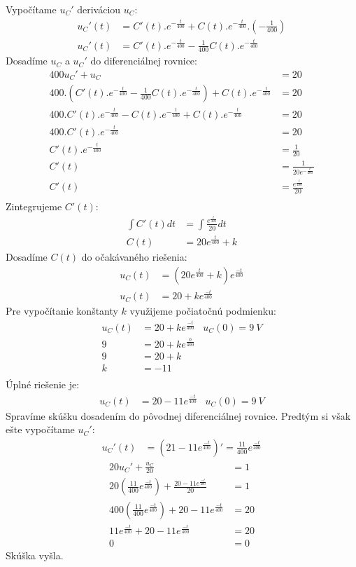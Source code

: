 Vypočítame $u_{C}'$ deriváciou $u_C$: 
\begin{align*}
    u_{C}' (t) &= C'(t).e^{-\frac{t}{400}} + C(t).e^{-\frac{t}{400}}.\left(-\frac{1}{400}\right) \\
    u_{C}' (t) &= C'(t).e^{-\frac{t}{400}} - \frac{1}{400}C(t).e^{-\frac{t}{400}}
\end{align*}
Dosadíme $u_{C}$ a $u_{C}'$ do diferenciálnej rovnice: 
\begin{align*}
    400u_{C}'+ u_{C} &= 20 \\
    400.\left(C'(t).e^{-\frac{t}{400}} - \frac{1}{400}C(t).e^{-\frac{t}{400}}\right) + C(t).e^{-\frac{t}{400}} &= 20 \\
    400.C'(t).e^{-\frac{t}{400}} - C(t).e^{-\frac{t}{400}} + C(t).e^{-\frac{t}{400}} &= 20 \\
    400.C'(t).e^{-\frac{t}{400}} &= 20 \\
    C'(t).e^{-\frac{t}{400}} &= \frac{1}{20} \\
    C'(t) &= \frac{1}{20e^{-\frac{t}{400}}} \\
    C'(t) &= \frac{e^{\frac{t}{400}}}{20} \\
\end{align*}
Zintegrujeme $C'(t)$:
\begin{align*}
    \int C'(t) dt &= \int \frac{e^{\frac{t}{400}}}{20} dt \\
    C(t) &= 20e^{\frac{t}{400}} + k
\end{align*}
Dosadíme $C (t)$ do očakávaného riešenia: 
\begin{align*}
    u_{C} (t) &= (20e^{\frac{t}{400}} + k)e^{\frac{-t}{400}}  \\
    u_{C} (t) &= 20 + ke^{\frac{-t}{400}} 
\end{align*}
Pre vypočítanie konštanty $k$ využijeme počiatočnú podmienku:
\begin{align*}
    u_{C} (t) &= 20 + ke^{\frac{-t}{400}} & u_{C} (0) = 9~V \\
    9 &= 20 + ke^{\frac{0}{400}} \\
    9 &= 20 + k \\
    k &= -11 \\
\end{align*}
Úplné riešenie je: 
\begin{align*}
    u_{C} (t) &= 20 - 11e^{\frac{-t}{400}} & u_{C} (0) = 9~V
\end{align*}
Spravíme skúšku dosadením do pôvodnej diferenciálnej rovnice. Predtým si však ešte vypočítame $u_{C}'$:
\begin{align*}
    u_{C}'(t) &= \left(21 - 11e^{\frac{-t}{400}}\right)' = \frac{11}{400}e^{\frac{-t}{400}}
\end{align*}
\begin{align*}
    20u_{C}' + \frac{u_{C}}{20}& = 1 \\
    20\left(\frac{11}{400}e^{\frac{-t}{400}}\right) + \frac{20 - 11e^{\frac{-t}{400}}}{20} &= 1 \\
    400\left(\frac{11}{400}e^{\frac{-t}{400}}\right) + 20 - 11e^{\frac{-t}{400}} &= 20\\
    11e^{\frac{-t}{400}} + 20 - 11e^{\frac{-t}{400}} &= 20\\
    0 &= 0
\end{align*}
Skúška vyšla.
\newpage
